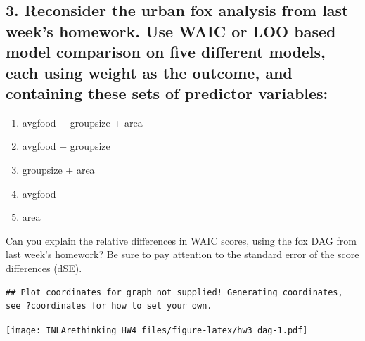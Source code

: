 \documentclass[
]{article}
\newenvironment{Shaded}{\begin{snugshade}}{\end{snugshade}}
\newcommand{\KeywordTok}[1]{\textcolor[rgb]{0.13,0.29,0.53}{\textbf{#1}}}
\newcommand{\NormalTok}[1]{#1}
\newcommand{\OperatorTok}[1]{\textcolor[rgb]{0.81,0.36,0.00}{\textbf{#1}}}
\newcommand{\StringTok}[1]{\textcolor[rgb]{0.31,0.60,0.02}{#1}}
\providecommand{\tightlist}{%
  \setlength{\itemsep}{0pt}\setlength{\parskip}{0pt}}
\begin{document}
\hypertarget{reconsider-the-urban-fox-analysis-from-last-weeks-homework.-use-waic-or-loo-based-model-comparison-on-five-different-models-each-using-weight-as-the-outcome-and-containing-these-sets-of-predictor-variables}{%
\subsection{3. Reconsider the urban fox analysis from last week's
homework. Use WAIC or LOO based model comparison on five different
models, each using weight as the outcome, and containing these sets of
predictor
variables:}\label{reconsider-the-urban-fox-analysis-from-last-weeks-homework.-use-waic-or-loo-based-model-comparison-on-five-different-models-each-using-weight-as-the-outcome-and-containing-these-sets-of-predictor-variables}}

\begin{enumerate}
\def\labelenumi{(\arabic{enumi})}
\tightlist
\item
  avgfood + groupsize + area
\item
  avgfood + groupsize
\item
  groupsize + area
\item
  avgfood
\item
  area
\end{enumerate}

Can you explain the relative differences in WAIC scores, using the fox
DAG from last week's homework? Be sure to pay attention to the standard
error of the score differences (dSE).

\begin{verbatim}
## Plot coordinates for graph not supplied! Generating coordinates, see ?coordinates for how to set your own.
\end{verbatim}

\texttt{[image: INLArethinking\_HW4\_files/figure-latex/hw3 dag-1.pdf]}

\begin{Shaded}
\end{Shaded}
\end{document}
